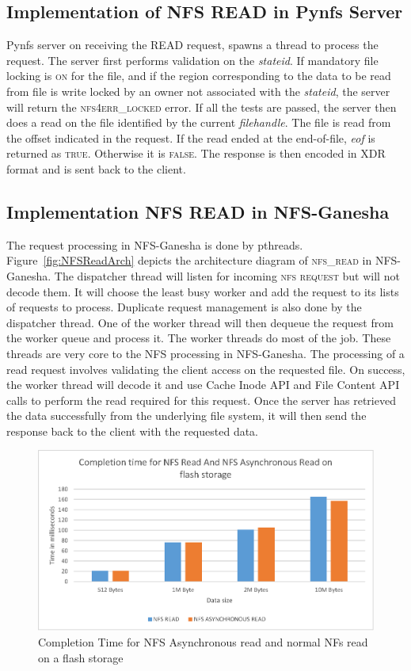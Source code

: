\subsection{Implementation of NFS READ in Pynfs Server}
Pynfs server on receiving the READ request, spawns a thread to process the request. The server first performs validation on the \textit{stateid}. If mandatory file locking is \textsc{on} for the file, and if the region corresponding to the data to be read from file is write locked by an owner not associated with the \textit{stateid}, the server will return the \textsc{nfs4err\_locked} error. If all the tests are passed, the server then does a read on the file identified by the current \textit{filehandle}. The file is read from the offset indicated in the request.  If the read ended at the end-of-file, \textit{eof} is returned as  \textsc{true}. Otherwise it is \textsc{false}. The response is then encoded in XDR format and is sent back to the client.
	
\subsection{Implementation NFS READ in NFS-Ganesha}

 The request processing in NFS-Ganesha is done by pthreads. Figure~\ref{fig:NFSReadArch} depicts the architecture diagram \cite{NFSv4} of \textsc{nfs\_read} in NFS-Ganesha. The dispatcher thread will listen for incoming \textsc{nfs request} but will not decode them. It will choose the least busy worker and add the request to its lists of requests to process. Duplicate request management is also done by the dispatcher thread. One of the worker thread will then dequeue the request from the worker queue and process it. The worker threads do most of the job. These threads are very core to the NFS processing in NFS-Ganesha. The processing of a read request involves validating the client access on the requested file. On success, the worker thread will decode it and use Cache Inode API and File Content API calls to perform the read required for this request. Once the server has retrieved the data successfully from the underlying file system, it will then send the response back to the client with the requested data.
  
\begin{figure}
\centering
\includegraphics[scale=1.0]{figures/completion_time.eps}
\caption{Completion	Time for NFS Asynchronous read and normal NFs read on a flash storage}
\label{fig:NFSCompletionTimes}
\end{figure}  

